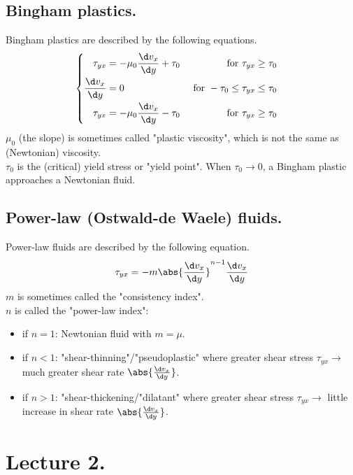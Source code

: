\subsection{Bingham plastics.}
Bingham plastics are described by the following equations.
\[
	\begin{cases}
		\begin{aligned}
			\tau_{yx}           & =-\mu_0\frac{\d v_x}{\d y}+\tau_0 & \ \text{for} \ \tau_{yx}\geq\tau_0            \\
			\frac{\d v_x}{\d y} & =0                                & \ \text{for} \ -\tau_0\leq\tau_{yx}\leq\tau_0 \\
			\tau_{yx}           & =-\mu_0\frac{\d v_x}{\d y}-\tau_0 & \ \text{for} \ \tau_{yx}\geq\-\tau_0
		\end{aligned}
	\end{cases}
\]
$\mu_0$ (the slope) is sometimes called "plastic viscosity", which is not the same as (Newtonian) viscosity.\\
$\tau_0$ is the (critical) yield stress or "yield point". When $\tau_0\to0$, a Bingham plastic approaches a Newtonian fluid.

\subsection{Power-law (Ostwald-de Waele) fluids.}
Power-law fluids are described by the following equation.
\begin{align*}
	\tau_{yx}=-m\abs{\frac{\d v_x}{\d y}}^{n-1}\frac{\d v_x}{\d y}
\end{align*}
$m$ is sometimes called the "consistency index".\\
$n$ is called the "power-law index":
\begin{itemize}
	\item if $n=1$: Newtonian fluid with $m=\mu$.
	\item if $n<1$: "shear-thinning"/"pseudoplastic" where greater shear stress $\tau_{yx}\to$ much greater shear rate $\abs{\frac{\d v_x}{\d y}}$.
	\item if $n>1$: "shear-thickening/"dilatant" where greater shear stress $\tau_{yx}\to$ little increase in shear rate $\abs{\frac{\d v_x}{\d y}}$.
\end{itemize}

\section{Lecture 2.}
